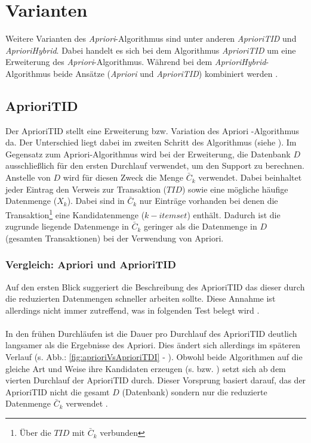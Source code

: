\chapter{Varianten}

Weitere Varianten des \textit{Apriori}-Algorithmus sind unter anderen \textit{AprioriTID} und \textit{AprioriHybrid}. 
Dabei handelt es sich bei dem Algorithmus \textit{AprioriTID} um eine Erweiterung des \textit{Apriori}-Algorithmus. Während bei dem \textit{AprioriHybrid}-Algorithmus beide Ansätze (\textit{Apriori} und \textit{AprioriTID}) kombiniert werden \parencite[s.][3.2 BFS and Counting Occurences]{VARIANTEN}.

\section{AprioriTID} \label{aprioriTid}
Der AprioriTID stellt eine Erweiterung bzw. Variation des Apriori -Algorithmus da. 
Der Unterschied liegt dabei im zweiten Schritt des Algorithmus (siehe ). 
Im Gegensatz zum Apriori-Algorithmus wird bei der Erweiterung, die Datenbank $D$ ausschließlich für den ersten Durchlauf verwendet, um den Support zu berechnen. 
Anstelle von $D$ wird für diesen Zweck die Menge $\bar{C}_k$ verwendet. 
Dabei beinhaltet jeder Eintrag den Verweis zur Transaktion ($TID$) sowie eine mögliche häufige Datenmenge ($X_k$). 
Dabei sind in $\bar{C}_k$ nur Einträge vorhanden bei denen die Transaktion\footnote{Über die $TID$ mit $\bar{C}_k$ verbunden} eine Kandidatenmenge ($k-itemset$) enthält. 
Dadurch ist die zugrunde liegende Datenmenge in  $\bar{C}_k$ geringer als die Datenmenge in $D$ (gesamten Transaktionen) bei der Verwendung von Apriori. 


\parencite[s.][2.2 Algorithm AprioriTid]{IBM}

\subsection{Vergleich: Apriori und AprioriTID} \label{subsec:vergleichBasicVsTid}
Auf den ersten Blick suggeriert die Beschreibung des AprioriTID das dieser durch die reduzierten Datenmengen schneller arbeiten sollte.
Diese Annahme ist allerdings nicht immer zutreffend, was in folgenden Test belegt wird \parencite[s.][3.6 Algorithm AprioriHybrid]{IBM}.\\
\\
In den frühen Durchläufen ist die Dauer pro Durchlauf des AprioriTID deutlich langsamer als die Ergebnisse des Apriori. 
Dies ändert sich allerdings im späteren Verlauf (s. Abb.: \ref{fig:aprioriVsAprioriTDI} - ).
Obwohl beide Algorithmen auf die gleiche Art und Weise ihre Kandidaten erzeugen (s.  bzw. ) setzt sich ab dem vierten Durchlauf der AprioriTID durch. 
Dieser Vorsprung basiert darauf, das der AprioriTID nicht die gesamt $D$ (Datenbank) sondern nur die reduzierte Datenmenge $\bar{C}_k$ verwendet \parencite[s.][3.6 Algorithm AprioriHybrid]{IBM}.


